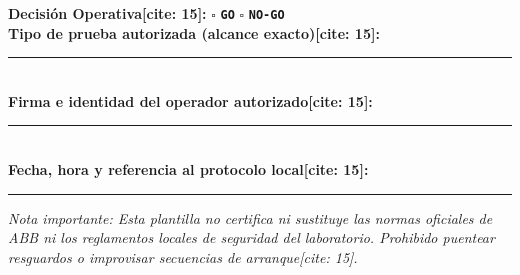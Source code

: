 \documentclass[11pt, a4paper]{article}
\begin{document}
\vspace{0.3cm}
\begin{tcolorbox}[colback=white, colframe=black, title=\textbf{Registro de Decisión para Prueba Específica} {[cite: 15]}, left=2mm, right=2mm, top=2mm, bottom=2mm]
    \small
    \textbf{Decisión Operativa[cite: 15]:} \qquad $\square$ \textbf{\texttt{GO}} \qquad\qquad $\square$ \textbf{\texttt{NO-GO}} \\[0.3cm]
    \textbf{Tipo de prueba autorizada (alcance exacto)[cite: 15]:} \rule{9.5cm}{0.15mm} \\[0.3cm]
    \textbf{Firma e identidad del operador autorizado[cite: 15]:} \rule{9.2cm}{0.15mm} \\[0.3cm]
    \textbf{Fecha, hora y referencia al protocolo local[cite: 15]:} \rule{9.2cm}{0.15mm}
    \vspace{0.15cm}
    \par\scriptsize\textit{Nota importante: Esta plantilla no certifica ni sustituye las normas oficiales de ABB ni los reglamentos locales de seguridad del laboratorio. Prohibido puentear resguardos o improvisar secuencias de arranque[cite: 15].}
\end{tcolorbox}
\end{document}
